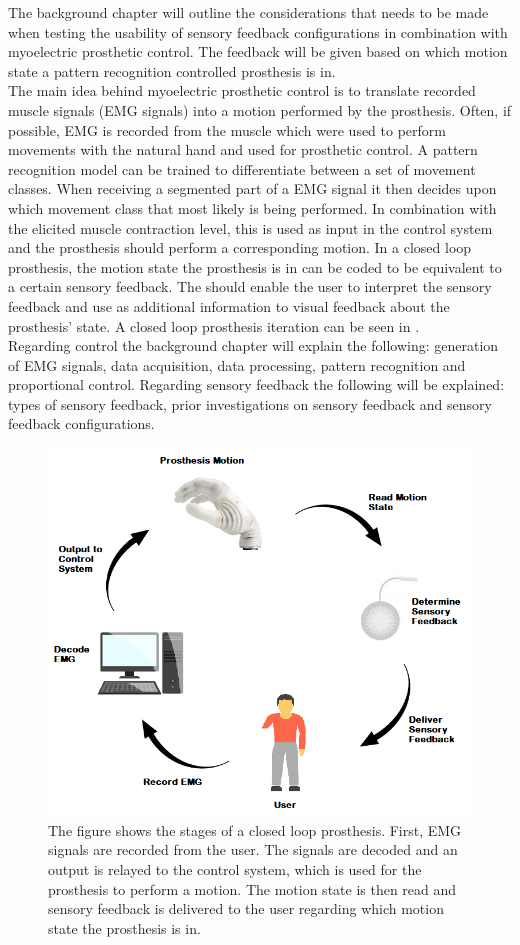 The background chapter will outline the considerations that needs to be made when testing the usability of sensory feedback configurations in combination with myoelectric prosthetic control. The feedback will be given based on which motion state a pattern recognition controlled prosthesis is in. \\ 
The main idea behind myoelectric prosthetic control is to translate recorded muscle signals (EMG signals) into a motion performed by the prosthesis. Often, if possible, EMG is recorded from the muscle which were used to perform movements with the natural hand and used for prosthetic control. A pattern recognition model can be trained to differentiate between a set of movement classes. When receiving a segmented part of a EMG signal it then decides upon which movement class that most likely is being performed. In combination with the elicited muscle contraction level, this is used as input in the control system and the prosthesis should perform a corresponding motion. \cite{Guanglin2010} In a closed loop prosthesis, the motion state the prosthesis is in can be coded to be equivalent to a certain sensory feedback. The should enable the user to interpret the sensory feedback and use as additional information to visual feedback about the prosthesis' state. \cite{Strbac2016} A closed loop prosthesis iteration can be seen in . \\
Regarding control the background chapter will explain the following: generation of EMG signals, data acquisition, data processing, pattern recognition and proportional control. Regarding sensory feedback the following will be explained: types of sensory feedback, prior investigations on sensory feedback and sensory feedback configurations. 

\begin{figure}[H]                 
	\includegraphics[width=.65\textwidth]{figures/closed_loop_pros}  
	\caption{The figure shows the stages of a closed loop prosthesis. First, EMG signals are recorded from the user. The signals are decoded and an output is relayed to the control system, which is used for the prosthesis to perform a motion. The motion state is then read and sensory feedback is delivered to the user regarding which motion state the prosthesis is in.}
	\label{fig:closed_loop_pros} 
\end{figure}